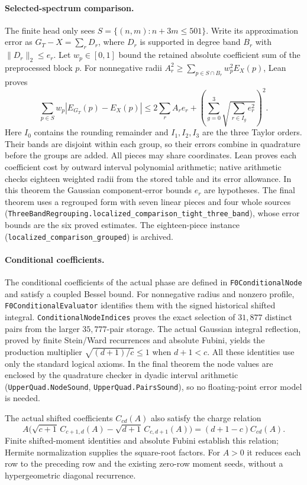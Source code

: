 \documentclass[11pt,a4paper]{article}
\newcommand{\lean}[1]{\texttt{\small #1}}
\begin{document}
\paragraph{Selected-spectrum comparison.}
The finite head only sees $S=\{(n,m):n+3m\le501\}$. Write its approximation error as
$G_T-X=\sum_r D_r$, where $D_r$ is supported in degree band $B_r$ with $\|D_r\|_2\le e_r$.
Let $w_p\in[0,1]$ bound the retained absolute coefficient sum of the preprocessed block $p$.
For nonnegative radii $A_r^2\ge\sum_{p\in S\cap B_r}w_p^2E_X(p)$, Lean proves
\[
 \sum_{p\in S}w_p|E_{G_T}(p)-E_X(p)|
 \le2\sum_r A_re_r+\left(\sum_{g=0}^3\sqrt{\sum_{r\in I_g}e_r^2}\right)^2.
\]
Here $I_0$ contains the rounding remainder and $I_1,I_2,I_3$ are the three Taylor orders.
Their bands are disjoint within each group, so their errors combine in quadrature before the groups are added.
All pieces may share coordinates. Lean proves each coefficient cost by outward interval polynomial arithmetic;
native arithmetic checks eighteen weighted radii from the stored table and its error allowance.
In this theorem the Gaussian component-error bounds $e_r$ are hypotheses. The final theorem uses a regrouped form with
seven linear pieces and four whole sources (\lean{ThreeBandRegrouping.localized\_comparison\_tight\_three\_band}),
whose error bounds are the six proved estimates. The eighteen-piece instance
(\lean{localized\_comparison\_grouped}) is archived.

\paragraph{Conditional coefficients.}
The conditional coefficients of the actual phase are defined in
\texttt{F0ConditionalNode} and satisfy a coupled Bessel bound.
For nonnegative radius and nonzero profile, \texttt{F0ConditionalEvaluator}
identifies them with the signed historical shifted integral.
\texttt{ConditionalNodeIndices} proves the exact selection of $31{,}877$
distinct pairs from the larger $35{,}777$-pair storage.
The actual Gaussian integral reflection, proved by finite Stein/Ward
recurrences and absolute Fubini, yields the production multiplier
$\sqrt{(d+1)/c}\le1$ when $d+1<c$. All these identities use only the
standard logical axioms. In the final theorem the node values are enclosed by
the quadrature checker in dyadic interval arithmetic (\lean{UpperQuad.NodeSound},
\lean{UpperQuad.PairsSound}), so no floating-point error model is needed.

The actual shifted coefficients $C_{cd}(A)$ also satisfy the charge relation
\[
 A\bigl(\sqrt{c+1}\,C_{c+1,d}(A)-\sqrt{d+1}\,C_{c,d+1}(A)\bigr)
   =(d+1-c)C_{cd}(A).
\]
Finite shifted-moment identities and absolute Fubini establish this relation;
Hermite normalization supplies the square-root factors. For $A>0$ it reduces
each row to the preceding row and the existing zero-row moment seeds, without
a hypergeometric diagonal recurrence.
\end{document}
